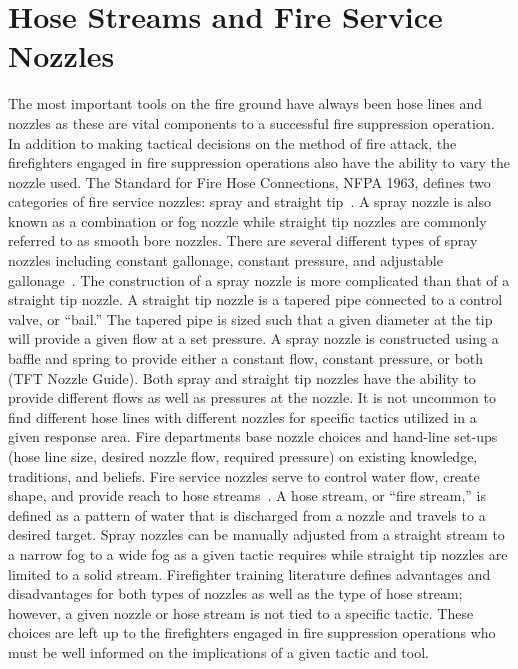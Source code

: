 \documentclass[12pt,oneside]{book}
\begin{document}
\section*{Hose Streams and Fire Service Nozzles}
The most important tools on the fire ground have always been hose lines and nozzles as these are vital components to a successful fire suppression operation. In addition to making tactical decisions on the method of fire attack, the firefighters engaged in fire suppression operations also have the ability to vary the nozzle used. The Standard for Fire Hose Connections, NFPA 1963, defines two categories of fire service nozzles: spray and straight tip~\cite{NFPA1963}. A spray nozzle is also known as a combination or fog nozzle while straight tip nozzles are commonly referred to as smooth bore nozzles. There are several different types of spray nozzles including constant gallonage, constant pressure, and adjustable gallonage~\cite{FEHandbook}. The construction of a spray nozzle is more complicated than that of a straight tip nozzle. A straight tip nozzle is a tapered pipe connected to a control valve, or ``bail.'' The tapered pipe is sized such that a given diameter at the tip will provide a given flow at a set pressure. A spray nozzle is constructed using a baffle and spring to provide either a constant flow, constant pressure, or both (TFT Nozzle Guide). Both spray and straight tip nozzles have the ability to provide different flows as well as pressures at the nozzle. It is not uncommon to find different hose lines with different nozzles for specific tactics utilized in a given response area. Fire departments base nozzle choices and hand-line set-ups (hose line size, desired nozzle flow, required pressure) on existing knowledge, traditions, and beliefs. Fire service nozzles serve to control water flow, create shape, and provide reach to hose streams~\cite{Essentials6}. A hose stream, or ``fire stream,'' is defined as a pattern of water that is discharged from a nozzle and travels to a desired target. Spray nozzles can be manually adjusted from a straight stream to a narrow fog to a wide fog as a given tactic requires while straight tip nozzles are limited to a solid stream. Firefighter training literature defines advantages and disadvantages for both types of nozzles as well as the type of hose stream; however, a given nozzle or hose stream is not tied to a specific tactic. These choices are left up to the firefighters engaged in fire suppression operations who must be well informed on the implications of a given tactic and tool.
\end{document}
